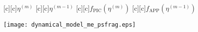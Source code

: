 \documentclass{article}
\begin{document}
\begin{figure}[htb]
  \begin{center}


        [c][c]{$\eta^{(m)}$}
        [c][c]{$\eta^{(m-1)}$}
        [c][c]{$f_{\mathrm{PIC}}(\eta^{(m)})$}
        [c][c]{\hspace{0.5mm}$f_{\mathrm{APP}}(\eta^{(m-1)})$}

    \texttt{[image: dynamical\_model\_me\_psfrag.eps]}
    \end{center}
\end{figure}
\end{document}
